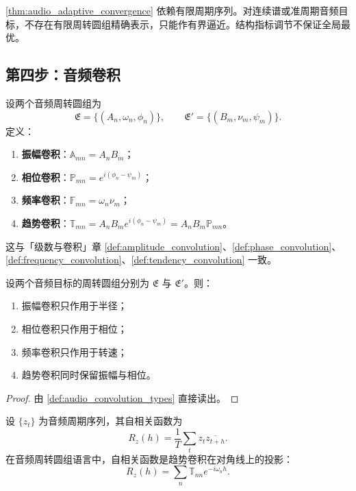 \begin{remark}[动态调节的边界]\label{rem:audio_adaptive_boundary}
\cref{thm:audio_adaptive_convergence} 依赖有限周期序列。对连续谱或准周期音频目标，不存在有限周转圆组精确表示，只能作有界逼近。结构指标调节不保证全局最优。
\end{remark}

\subsection{第四步：音频卷积}

\begin{definition}\label{def:audio_convolution_types}
设两个音频周转圆组为
\[
\mathfrak E=\{(A_n,\omega_n,\phi_n)\},\qquad
\mathfrak E'=\{(B_m,\nu_m,\psi_m)\}.
\]
定义：
\begin{enumerate}[label=(\roman*)]
    \item \textbf{振幅卷积}：$\mathbb A_{mn}=A_nB_m$；
    \item \textbf{相位卷积}：$\mathbb P_{mn}=e^{i(\phi_n-\psi_m)}$；
    \item \textbf{频率卷积}：$\mathbb F_{mn}=\omega_n\nu_m$；
    \item \textbf{趋势卷积}：$\mathbb T_{mn}=A_nB_m e^{i(\phi_n-\psi_m)}=A_nB_m\mathbb P_{mn}$。
\end{enumerate}
这与「级数与卷积」章 \cref{def:amplitude_convolution}、\cref{def:phase_convolution}、\cref{def:frequency_convolution}、\cref{def:tendency_convolution} 一致。
\end{definition}

\begin{theorem}[三类卷积在音频周转圆组上的作用]\label{thm:audio_convolution_action}
设两个音频目标的周转圆组分别为 $\mathfrak E$ 与 $\mathfrak E'$。则：
\begin{enumerate}[label=(\roman*)]
    \item 振幅卷积只作用于半径；
    \item 相位卷积只作用于相位；
    \item 频率卷积只作用于转速；
    \item 趋势卷积同时保留振幅与相位。
\end{enumerate}
\end{theorem}

\begin{proof}
由 \cref{def:audio_convolution_types} 直接读出。
\end{proof}

\begin{proposition}[自相关与趋势卷积]\label{prop:audio_autocorr_phase_convolution}
设 $\{z_t\}$ 为音频周期序列，其自相关函数为
\[
R_z(h)=\frac1T\sum_t z_t\overline{z_{t+h}}.
\]
在音频周转圆组语言中，自相关函数是趋势卷积在对角线上的投影：
\[
R_z(h)=\sum_n\mathbb T_{nn}e^{-i\omega_n h}.
\]
\end{proposition}

